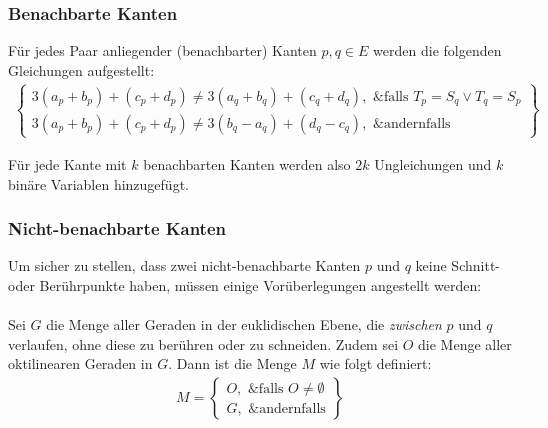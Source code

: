 \documentclass[a4paper,11pt]{amsart}
\begin{document}
\subsubsection*{Benachbarte Kanten} Für jedes Paar anliegender (benachbarter) Kanten $p, q \in E$ werden die folgenden Gleichungen aufgestellt:
\bigskip
\begin{gather*}
\left\{\begin{array}{lr}
    3 (a_p + b_p) + (c_p + d_p) \ne 3 (a_q + b_q) + (c_q + d_q), \text{ &falls } T_p = S_q \lor T_q = S_p \\
    3 (a_p + b_p) + (c_p + d_p) \ne 3 (b_q - a_q) + (d_q - c_q), \text{ &andernfalls}
\end{array}\right\}
\end{gather*}

\bigskip
\noindent Für jede Kante mit $k$ benachbarten Kanten werden also $2k$ Ungleichungen und $k$ binäre Variablen hinzugefügt.

\subsubsection*{Nicht-benachbarte Kanten}

Um sicher zu stellen, dass zwei nicht-benachbarte Kanten $p$ und $q$ keine Schnitt- oder Berührpunkte haben, müssen einige Vorüberlegungen angestellt werden:\\\\
Sei $G$ die Menge aller Geraden in der euklidischen Ebene, die \textit{zwischen} $p$ und $q$ verlaufen, ohne diese zu berühren oder zu schneiden. Zudem sei $O$ die Menge aller oktilinearen Geraden in $G$. Dann ist die Menge $M$ wie folgt definiert:
\bigskip
\begin{gather*}
M = \left\{\begin{array}{lr}
    O, \text{ &falls } O \ne \emptyset \\
    G, \text{ &andernfalls}
\end{array}\right\}
\end{gather*}
\end{document}

